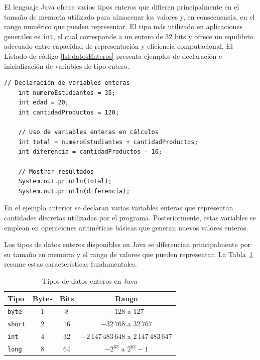 \documentclass[12pt,twoside]{book}
\begin{document}
						El lenguaje Java ofrece varios tipos enteros que difieren principalmente en el tamaño de memoria utilizado para almacenar los valores y, en consecuencia, en el rango numérico que pueden representar. El tipo más utilizado en aplicaciones generales es \texttt{int}, el cual corresponde a un entero de 32 bits y ofrece un equilibrio adecuado entre capacidad de representación y eficiencia computacional. El Listado de código \ref{lst:datosEnteros} presenta ejemplos de declaración e inicialización de variables de tipo entero.
						
						\begin{lstlisting}[style=Java,caption={Datos enteros más comunes en Java.},label={lst:datosEnteros}]
	// Declaración de variables enteras
	int numeroEstudiantes = 35;
	int edad = 20;
	int cantidadProductos = 120;
	
	// Uso de variables enteras en cálculos
	int total = numeroEstudiantes + cantidadProductos;
	int diferencia = cantidadProductos - 10;
	
	// Mostrar resultados
	System.out.println(total);
	System.out.println(diferencia);
						\end{lstlisting}
						
						\noindent
						En el ejemplo anterior se declaran varias variables enteras que representan cantidades discretas utilizadas por el programa. Posteriormente, estas variables se emplean en operaciones aritméticas básicas que generan nuevos valores enteros.
						
						Los tipos de datos enteros disponibles en Java se diferencian principalmente por su tamaño en memoria y el rango de valores que pueden representar. La Tabla~\ref{tab:javaintegertypes} resume estas características fundamentales.
						
						\begin{table}[!hbt]
							\centering
							\caption{Tipos de datos enteros en Java}
							\label{tab:javaintegertypes}
							\begin{tabular}{lccc}
								\toprule
								\textbf{Tipo} & \textbf{Bytes} & \textbf{Bits} & \textbf{Rango} \\
								\midrule
								\texttt{byte}  & 1 & 8  & $-128$ a $127$ \\
								\texttt{short} & 2 & 16 & $-32\,768$ a $32\,767$ \\
								\texttt{int}   & 4 & 32 & $-2\,147\,483\,648$ a $2\,147\,483\,647$ \\
								\texttt{long}  & 8 & 64 & $-2^{63}$ a $2^{63}-1$ \\
								\bottomrule
							\end{tabular}
						\end{table}
						
\end{document}
